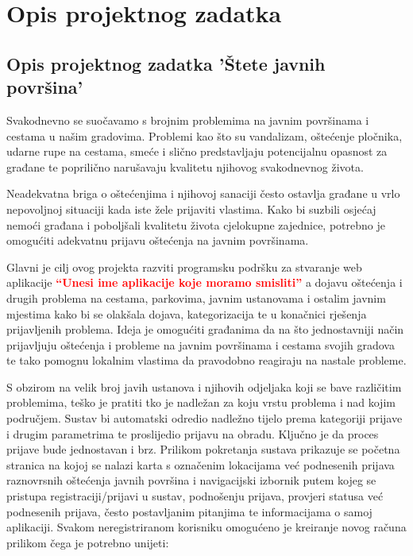 \chapter{Opis projektnog zadatka}

\section{Opis projektnog zadatka 'Štete javnih površina'}

\noindent Svakodnevno se suočavamo s brojnim problemima na javnim površinama i cestama u našim gradovima. Problemi kao što su vandalizam, oštećenje pločnika, udarne rupe na cestama, smeće i slično predstavljaju potencijalnu opasnost za građane te poprilično narušavaju kvalitetu njihovog svakodnevnog života.

\noindent Neadekvatna briga o oštećenjima i njihovoj sanaciji često ostavlja građane u vrlo nepovoljnoj situaciji kada iste žele prijaviti vlastima. Kako bi suzbili osjećaj nemoći građana i poboljšali kvalitetu života cjelokupne zajednice, potrebno je omogućiti adekvatnu prijavu oštećenja na javnim površinama.

\noindent Glavni je cilj ovog projekta razviti programsku podršku za stvaranje web aplikacije
\textcolor{red}{\textbf{“Unesi ime aplikacije koje moramo smisliti”}} a dojavu oštećenja i drugih problema na cestama, parkovima, javnim ustanovama i ostalim javnim mjestima kako bi se olakšala dojava, kategorizacija te u konačnici rješenja prijavljenih problema. Ideja je omogućiti građanima da na što jednostavniji način prijavljuju oštećenja i probleme na javnim površinama i cestama svojih gradova te tako pomognu lokalnim vlastima da pravodobno reagiraju na nastale probleme.

\noindent S obzirom na velik broj javih ustanova i njihovih odjeljaka koji se bave različitim problemima, teško je pratiti tko je nadležan za koju vrstu problema i nad kojim područjem. Sustav bi automatski odredio nadležno tijelo prema kategoriji prijave i drugim parametrima te proslijedio prijavu na obradu. Ključno je da proces prijave bude jednostavan i brz.
\noindent Prilikom pokretanja sustava prikazuje se početna stranica na kojoj se nalazi karta s označenim lokacijama već podnesenih prijava raznovrsnih oštećenja javnih površina i navigacijski izbornik putem kojeg se pristupa registraciji/prijavi u sustav, podnošenju prijava, provjeri statusa već podnesenih prijava, često postavljanim pitanjima te informacijama o samoj aplikaciji.
\noindent Svakom neregistriranom korisniku omogućeno je kreiranje novog računa prilikom čega je potrebno unijeti:

